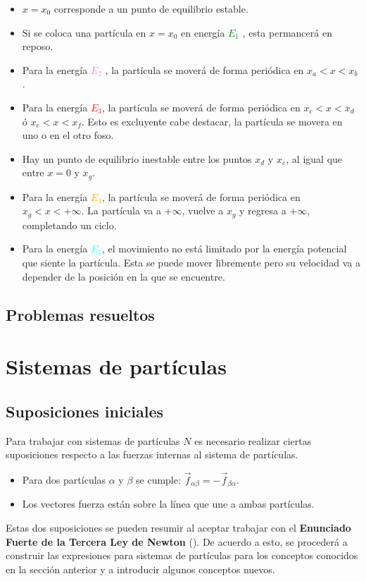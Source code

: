 \documentclass[/home/hernan-barquero/Documents/Apuntes_mecanica_teorica/main.tex]{subfiles}
\begin{document}
	\begin{itemize}
		\item $x = x_{0}$ corresponde a un punto de equilibrio estable.
		\item Si se coloca una partícula en $x = x_{0}$ en energía \textcolor{green}{$E_{1}$} , esta permancerá en reposo.
		\item Para la energía \textcolor{violet}{$E_{2}$} , la partícula se moverá de forma periódica en $x_{a} < x < x_{b}$.
		\item Para la energía \textcolor{red}{$E_{3}$}, la partícula se moverá de forma periódica en $x_{c} < x < x_{d}$ ó $x_{e} < x < x_{f}$. Esto es excluyente cabe destacar, la partícula se movera en uno o en el otro foso.
		\item Hay un punto de equilibrio inestable entre los puntos $x_{d}$ y $x_{e}$, al igual que entre $x = 0$ y $x_{g}$.
		\item Para la energía \textcolor{orange}{$E_{4}$}, la partícula se moverá de forma periódica en $x_{g} < x < +\infty $. La partícula va a $+\infty$, vuelve a $x_{g}$ y regresa a $+\infty$, completando un ciclo.
		\item Para la energía \textcolor{cyan}{$E_{5}$}, el movimiento no está limitado por la energía potencial que siente la partícula. Esta se puede mover libremente pero su velocidad va a depender de la posición en la que se encuentre.
	\end{itemize}


	\subsection{Problemas resueltos}

	
	

	\section{Sistemas de partículas}
	\label{sec: sisparticulas}

	\subsection{Suposiciones iniciales}

    Para trabajar con sistemas de partículas $N$ es necesario realizar ciertas suposiciones respecto a las fuerzas internas al sistema de partículas.

    \begin{itemize}
        \item Para dos partículas $\alpha$ y $\beta$ se cumple: $\vec{f}_{\alpha \beta} = - \vec{f}_{\beta \alpha}$.
        \item Los vectores fuerza están sobre la línea que une a ambas partículas.
    \end{itemize}
    Estas dos suposiciones se pueden resumir al aceptar trabajar con el \textbf{Enunciado Fuerte de la Tercera Ley de Newton}  (). De acuerdo a esto, se procederá a construir las expresiones para sistemas de partículas para los conceptos conocidos en la sección anterior y a introducir algunos conceptos nuevos.
\end{document}
